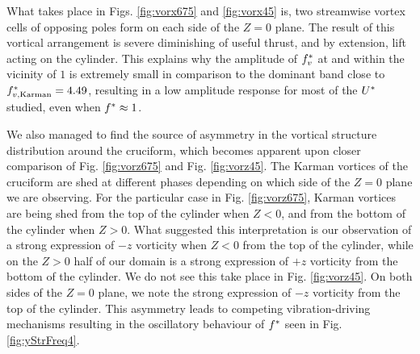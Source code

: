 \documentclass[oneside]{utmthesis}
\begin{document}
What takes place in Figs. \ref{fig:vorx675} and \ref{fig:vorx45} is, two streamwise vortex cells of opposing poles form on each side of the $Z = 0$ plane. The result of this vortical arrangement is severe diminishing of useful thrust, and by extension, lift acting on the cylinder. This explains why the amplitude of $f^{*}_{v}$ at and within the vicinity of $1$ is extremely small in comparison to the dominant band close to $f^{*}_{v,\text{Karman}} = 4.49$, resulting in a low amplitude response for most of the $U^{*}$ studied, even when $f^{*} \approx 1$.

We also managed to find the source of asymmetry in the vortical structure distribution around the cruciform, which becomes apparent upon closer comparison of Fig. \ref{fig:vorz675} and Fig. \ref{fig:vorz45}. The Karman vortices of the \angfo{} cruciform are shed at different phases depending on which side of the $Z = 0$ plane we are observing. For the particular case in Fig. \ref{fig:vorz675}, Karman vortices are being shed from the top of the cylinder when $Z < 0$, and from the bottom of the cylinder when $Z > 0$. What suggested this interpretation is our observation of a strong expression of $-z$ vorticity when $Z < 0$ from the top of the cylinder, while on the $Z > 0$ half of our domain is a strong expression of $+z$ vorticity from the bottom of the cylinder. We do not see this take place in Fig. \ref{fig:vorz45}. On both sides of the $Z = 0$ plane, we note the strong expression of $-z$ vorticity from the top of the cylinder. This asymmetry leads to competing vibration-driving mechanisms resulting in the oscillatory behaviour of $f^{*}$ seen in Fig. \ref{fig:yStrFreq4}.
\end{document}
